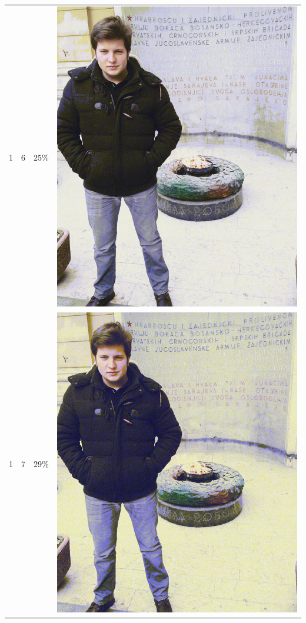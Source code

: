 \documentclass[times, utf8, seminar]{fer}
\begin{document}
\begin{center}
\begin{longtable}{|c|c|c|c|}
1 & 6 &25\% & \includegraphics[scale=0.3]{../benchmark_results/pattern/1_components-6_bits.png} \\
1 & 7 &29\% & \includegraphics[scale=0.3]{../benchmark_results/pattern/1_components-7_bits.png} \\

\end{longtable}
\end{center}
\end{document}
